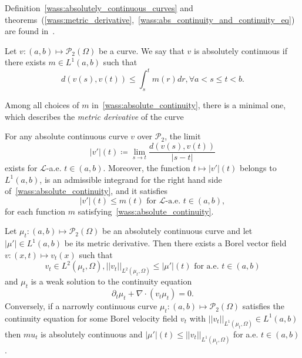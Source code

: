 Definition~\eqref{wass:absolutely_continuous_curves} 
and theorems~(\ref{wass:metric_derivative},~\ref{wass:abs_continuity_and_continuity_eq}) are found in~\cite{ambrosio2005gradient}. 

\begin{definition}\label{wass:absolutely_continuous_curves}
    Let $v : (a,b) \mapsto \mathcal{P}_2(\Omega)$ be a curve.
    We say that $v$ is absolutely continuous if there exists
    $m \in L^1(a,b)$ such that
    \begin{equation}\label{wass:absolute_continuity}
        d(v(s), v(t)) \leq \int_s^t m(r) dr, \forall a < s \leq t < b.
    \end{equation}
\end{definition}

Among all choices of $m$ in~\eqref{wass:absolute_continuity}, there is a minimal
one, which describes the \textit{metric derivative} of the curve
\begin{theorem}\label{wass:metric_derivative}
    For any absolute continuous curve $v$ over $\mathcal{P}_2$, the limit
    \begin{equation}
        |v'|(t) \coloneqq \lim_{s \to t} \frac{d(v(s), v(t))}{|s - t|}
    \end{equation}
    exists for $\mathcal{L}$-a.e. $t \in (a,b)$. Moreover, the function
    $ t \mapsto |v'|(t) $ belongs to $L^1(a,b)$, is an admissible integrand for
    the right hand side of~\eqref{wass:absolute_continuity}, and it satisfies
    \begin{equation}
        |v'|(t) \leq m(t) \text{ for }\mathcal{L}\text{-a.e. } t \in (a,b),
    \end{equation}
    for each function $m$ satisfying~\eqref{wass:absolute_continuity}.
\end{theorem}

\begin{theorem}\label{wass:abs_continuity_and_continuity_eq}
    Let $\mu_t : (a,b) \mapsto \mathcal{P}_2(\Omega)$ be an absolutely continuous
    curve and let $|\mu'| \in L^1(a,b)$ be its metric derivative.
    Then there exists a Borel vector field $v : (x,t) \mapsto v_t(x)$ such that
    \begin{equation}
        v_t \in L^2(\mu_t, \Omega), ||v_t||_{L^2(\mu_t, \Omega)} \leq |\mu'|(t)\text{ for a.e. } t \in (a,b)
    \end{equation}
    and $\mu_t$ is a weak solution to the continuity equation
    \begin{equation}
        \partial_t \mu_t + \nabla \cdot (v_t \mu_t) = 0.
    \end{equation}
    Conversely, if a narrowly continuous curve 
    $\mu_t : (a,b) \mapsto \mathcal{P}_2(\Omega)$
    satisfies the continuity equation for some Borel velocity field $v_t$ with
    $||v_t||_{L^1(\mu_t, \Omega)} \in L^1(a,b)$ then $mu_t$ is absolutely continuous
    and $ |\mu'|(t) \leq  ||v_t||_{L^1(\mu_t, \Omega)}$ for a.e. $t \in (a,b)$.
\end{theorem}

